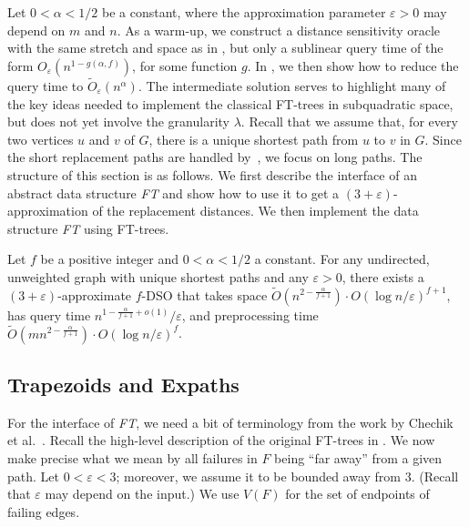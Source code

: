 \documentclass{article}\usepackage[a4paper,margin=20mm]{geometry}
\newcommand*{\Otilde}{\widetilde{O}}
\newcommand{\eps}{\varepsilon}
\begin{document}
Let $0 < \alpha < 1/2$ be a constant,
where the approximation parameter $\varepsilon > 0$ may depend on $m$ and $n$.
As a warm-up, we construct a
distance sensitivity oracle with the same stretch and space as in ,
but only a sublinear query time of the form $O_{\varepsilon}(n^{1-g(\alpha,f)})$,
for some function $g$.
In , we then show how to reduce the query time to $\Otilde_\eps(n^\alpha)$.
The intermediate solution serves to highlight many of the key ideas 
needed to implement the classical FT-trees in subquadratic space,
but does not yet involve the granularity $\lambda$. 
Recall that we assume that, for every two vertices $u$ and $v$ of $G$,
there is a unique shortest path from $u$ to $v$ in $G$.
Since the short replacement paths are handled by~,
we focus on long paths.
The structure of this section is as follows.
We first describe the interface of an abstract data structure \emph{FT}
and show how to use it to get a $(3{+}\eps)$-approximation of the replacement distances.
We then implement the data structure \emph{FT} using FT-trees.

\begin{lemma}
\label{lem:long_paths_sublinear_query}
  Let $f$ be a positive integer and $0 < \alpha < 1/2$ a constant.
  For any  undirected, unweighted graph
  with unique shortest paths
  and any $\eps > 0$,
  there exists a $(3{+}\eps)$-approximate \mbox{$f$-DSO}
  that takes space $\Otilde(n^{2-\frac{\alpha}{f+1}}) \cdot O(\log n/\varepsilon)^{f+1}$,
  has query time $n^{1-\frac{\alpha}{f+1}+o(1)}/\varepsilon$,
  and preprocessing time 
  $\Otilde(mn^{2-\frac{\alpha}{f+1}}) \cdot O(\log n/\varepsilon)^{f}$.
\end{lemma}


\subsection{Trapezoids and Expaths}
\label{subsec:sublinear_trapezoids}

For the interface of \emph{FT}, 
we need a bit of terminology from the work by Chechik et al.~\cite{ChCoFiKa17}.
Recall the high-level description of the original FT-trees in .
We now make precise what we mean by all failures in $F$ being ``far away'' from a given path.
Let $0< \eps < 3$; moreover, we assume it to be bounded away from $3$.
(Recall that $\varepsilon$ may depend on the input.)
We use $V(F)$ for the set of endpoints of failing edges.
\end{document}
